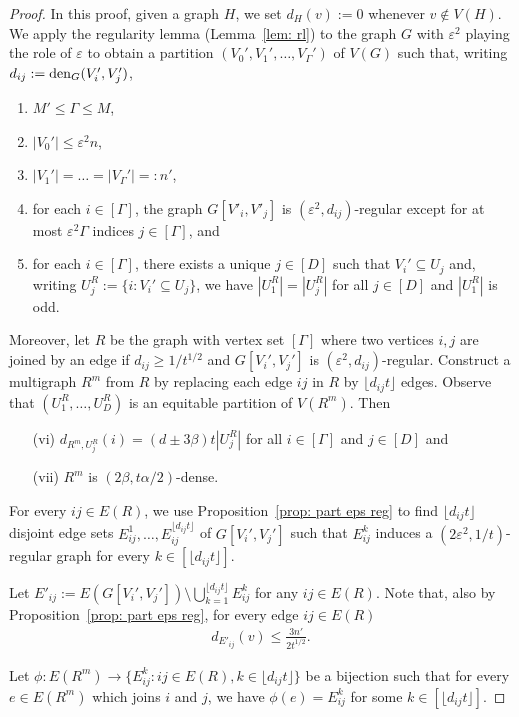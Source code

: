 \documentclass[a4paper, 11pt, reqno]{amsart}
\numberwithin{equation}{section}
\newcommand{\1}{{\rm 1\hspace*{-0.4ex}%
\rule{0.1ex}{1.52ex}\hspace*{0.2ex}}}
\newcommand{\den}{{\rm den}}
\renewcommand{\epsilon}{\varepsilon}
\newcommand{\sm}{\setminus}
\newcommand{\sub}{\subseteq}
\newcommand{\COMMENT}[1]{}
\begin{document}
\begin{proof}
In this proof,
given a graph $H$,
we set $d_H(v):=0$ whenever $v\notin V(H)$.\COMMENT{Do we use it somewhere else?}
We apply the regularity lemma (Lemma~\ref{lem: rl}) to the graph $G$ with $\epsilon^2$ playing the role of $\epsilon$
to obtain a partition $(V_0',V_1',\ldots,V_{\Gamma}')$ of $V(G)$ such that,
writing $d_{ij}:=\den_G(V_i',V_j')$,
\begin{enumerate}[label=(\roman*)]
	\item $M'\leq \Gamma \leq M$,
	\item $|V_0'|\leq \epsilon^2 n$,
	\item $|V_1'|=\ldots=|V_{\Gamma}'|=:n'$,
	\item for each $i\in [\Gamma]$, the graph $G[V'_i,V'_j]$ is $(\epsilon^2,d_{ij})$-regular except for at most $\epsilon^2 \Gamma$ indices $j \in [\Gamma]$, and		
	\item for each $i\in [\Gamma]$, there exists a unique $j \in [D]$ such that $V_i'\subseteq U_j$
	and, writing $U_j^R:=\{i:V_i' \sub U_j\}$, we have $|U_1^R|=|U_{j}^R| $ for all $j\in [D]$ and
	$|U_1^R|$ is odd.
\end{enumerate}
Moreover, 
let $R$ be the graph with vertex set $[\Gamma]$ where two vertices $i,j$ are joined by an edge 
if $d_{ij}\geq 1/t^{1/2}$ and $G[V_i',V_j']$ is $(\epsilon^2,d_{ij})$-regular.
Construct a multigraph $R^m$ from $R$ by
replacing each edge $ij$ in $R$ by $\lfloor d_{ij}t \rfloor$ edges.
Observe that $(U_1^R,\ldots,U_D^R)$ is an equitable partition  of $V(R^m)$.
Then
\begin{enumerate}
	\item [(vi)] $d_{R^m,U_j^R}(i)= (d\pm 3\beta)t|U_j^R|$ for all $i\in [\Gamma]$ and $j\in [D]$ and
	\item [(vii)] $R^m$ is $(2\beta,t\alpha/2)$-dense.
\end{enumerate}

For every $ij \in E(R)$, we use Proposition~\ref{prop: part  eps reg} to find $\lfloor d_{ij}t \rfloor$ disjoint edge sets $E_{ij}^1,\ldots,E_{ij}^{\lfloor d_{ij}t \rfloor}$ of $G[V_i',V_j']$
such that $E_{ij}^k$ induces a $(2\epsilon^2, 1/t )$-regular graph
for every $k\in [\lfloor d_{ij}t \rfloor]$. 


Let $E'_{ij}:= E(G[V_i',V_j'])\sm \bigcup_{k=1}^{\lfloor d_{ij}t \rfloor} E_{ij}^k$ for any $ij \in E(R)$. 
Note that, also by Proposition~\ref{prop: part  eps reg},
for every edge $ij\in E(R)$
\begin{align}\label{eq: E' deg}
	 d_{E'_{ij}}(v) \leq \frac{3n'}{2t^{1/2}}.
\end{align}
\COMMENT{
Get $d_{E'_{ij}}(v) \leq (1- \lfloor d_{ij}t \rfloor/td_{ij})n' + n'^{2/3}$. But $\lfloor d_{ij}t\rfloor/(td_{ij}) \geq  1- 1/(td_{ij}) \geq 1- 1/t^{1/2}$.
}
Let $\phi:E(R^m)\to \{E_{ij}^k: ij\in E(R), k\in \lfloor d_{ij}t \rfloor\}$ be a bijection
such that for every $e\in E(R^m)$ which joins $i$ and $j$, we have $\phi(e)= E_{ij}^k$ for some $k\in [\lfloor d_{ij}t \rfloor]$.


\end{proof}
\end{document}
